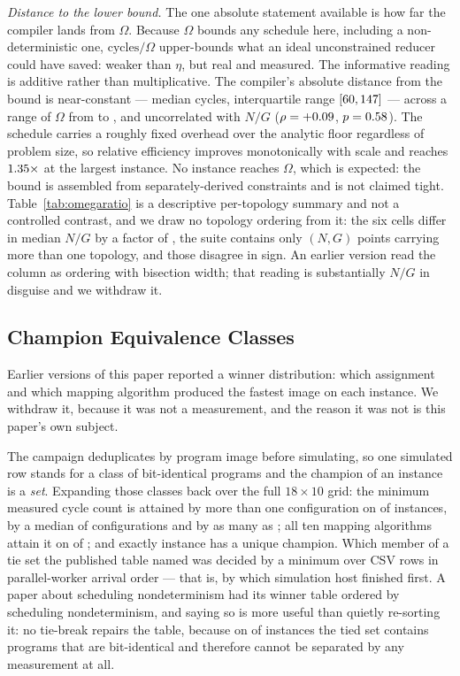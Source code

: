 \documentclass[journal,10pt]{IEEEtran}
\theoremstyle{plain}
\theoremstyle{definition}
\theoremstyle{remark}
\begin{document}
\emph{Distance to the lower bound.} The one absolute statement available is
how far the compiler lands from $\Omega$. Because $\Omega$ bounds any schedule
here, including a non-deterministic one, $\mathrm{cycles}/\Omega$
upper-bounds what an ideal unconstrained reducer could have saved: weaker than
$\eta$, but real and measured. The informative reading is additive rather than
multiplicative. The compiler's absolute distance from the bound is
near-constant --- median \SlackMedian{} cycles, interquartile range
$[60, 147]$ --- across a range of $\Omega$ from
\SlackOmegaLo{} to \SlackOmegaHi{}, and uncorrelated with $N/G$
($\rho = +0.09{}$, $p = 0.58{}$). The schedule carries a roughly
fixed overhead over the analytic floor regardless of problem size, so relative
efficiency improves monotonically with scale and reaches $1.35\times$ at
the largest instance. No instance reaches $\Omega$, which is expected: the
bound is assembled from separately-derived constraints and is not claimed
tight. Table~\ref{tab:omegaratio} is a descriptive per-topology summary and
not a controlled contrast, and we draw no topology ordering from it: the six
cells differ in median $N/G$ by a factor of \TopoNGSpread{}, the suite
contains only \TopoMultiPoint{} $(N,G)$ points carrying more than one
topology, and those \TopoMultiPoint{} disagree in sign. An earlier version
read the column as ordering with bisection width; that reading is
substantially $N/G$ in disguise and we withdraw it.

\subsection{Champion Equivalence Classes}\label{sec:results-classes}

Earlier versions of this paper reported a winner distribution: which
assignment and which mapping algorithm produced the fastest image on each
instance. We withdraw it, because it was not a measurement, and the reason it
was not is this paper's own subject.

The campaign deduplicates by program image before simulating, so one simulated
row stands for a class of bit-identical programs and the champion of an
instance is a \emph{set}. Expanding those classes back over the full
$18\times10$ grid: the minimum measured cycle count is attained by more than
one configuration on \ClsTied{} of \TournNInst{} instances, by a median of
\ClsMedian{} configurations and by as many as \ClsMax{}; all ten mapping
algorithms attain it on \ClsAllMappings{} of \TournNInst{}; and exactly
\ClsUnique{} instance has a unique champion. Which member of a tie set the
published table named was decided by a minimum over CSV rows in
parallel-worker arrival order --- that is, by which simulation host finished
first. A paper about scheduling nondeterminism had its winner table ordered by
scheduling nondeterminism, and saying so is more useful than quietly
re-sorting it: no tie-break repairs the table, because on \ClsTied{} of
\TournNInst{} instances the tied set contains programs that are bit-identical
and therefore cannot be separated by any measurement at all.
\end{document}
